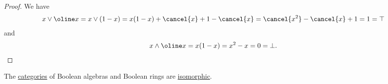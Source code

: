 \begin{proof}
   We have
  \begin{equation*}
    x \vee \oline x
    =
    x \vee (1 - x)
    =
    x(1 - x) + \cancel{x} + 1 - \cancel{x}
    =
    \cancel{x^2} - \cancel{x} + 1
    =
    1
    =
    \top
  \end{equation*}
  and
  \begin{equation*}
    x \wedge \oline x
    =
    x(1 - x)
    =
    x^2 - x
    =
    0
    =
    \bot.
  \end{equation*}
\end{proof}

\begin{proposition}\label{thm:categories_of_boolean_algebras_and_ring}
  The \hyperref[def:category]{categories} of Boolean algebras and Boolean rings are \hyperref[def:isomorphism_of_categories]{isomorphic}.
\end{proposition}
